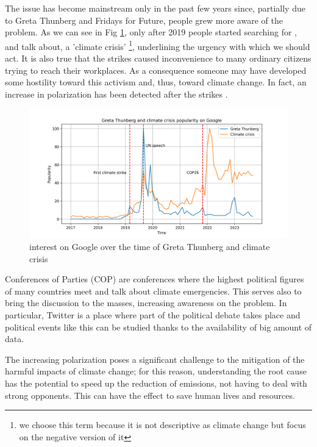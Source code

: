 The issue has become mainstream only in the past few years since, partially due to Greta Thunberg \cite{sabherwal_greta_2021} and Fridays for Future, people grew more aware of the problem. As we can see in Fig \ref{fig:google_greta}, only after 2019 people started searching for , and talk about, a 'climate crisis' \footnote{we choose this term because it is not descriptive as climate change but focus on the negative version of it}, underlining the urgency with which we should act. It is also true that the strikes caused inconvenience to many ordinary citizens trying to reach their workplaces. As a consequence someone may have developed some hostility toward this activism and, thus, toward climate change. In fact, an increase in polarization has been detected after the strikes \cite{Falkenberg_climate_2022}.
\\

\begin{figure}
    \centering
    \includegraphics[width=0.85\linewidth]{Chapter1/figures/greta_climate_crisis.png}
    \caption{interest on Google over the time of Greta Thunberg and climate crisis}
    \label{fig:google_greta}
\end{figure}

Conferences of Parties (COP) are conferences where the highest political figures of many countries meet and talk about climate emergencies. This serves also to bring the discussion to the masses, increasing awareness on the problem.
In particular, Twitter is a place where part of the political debate takes place \cite{Pew_twitter_2022} and political events like this can be studied thanks to the availability of big amount of data.


The increasing polarization poses a significant challenge to the mitigation of the harmful impacts of climate change; for this reason, understanding the root cause has the potential to speed up the reduction of emissions, not having to deal with strong opponents. This can have the effect to save human lives and resources.



